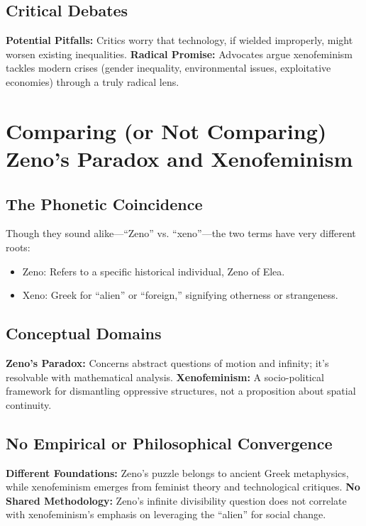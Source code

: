 \documentclass[12pt]{article}
\begin{document}
\subsection{Critical Debates}

\textbf{Potential Pitfalls:} Critics worry that technology, if wielded improperly, might worsen existing inequalities.  
\textbf{Radical Promise:} Advocates argue xenofeminism tackles modern crises (gender inequality, environmental issues, exploitative economies) through a truly radical lens.

\section{Comparing (or Not Comparing) Zeno’s Paradox and Xenofeminism}

\subsection{The Phonetic Coincidence}

Though they sound alike---``Zeno'' vs. ``xeno''---the two terms have very different roots: 
\begin{itemize}
    \item Zeno: Refers to a specific historical individual, Zeno of Elea. 
    \item Xeno: Greek for ``alien'' or ``foreign,'' signifying otherness or strangeness.
\end{itemize}

\subsection{Conceptual Domains}

\textbf{Zeno’s Paradox:} Concerns abstract questions of motion and infinity; it's resolvable with mathematical analysis.  
\textbf{Xenofeminism:} A socio-political framework for dismantling oppressive structures, not a proposition about spatial continuity.

\subsection{No Empirical or Philosophical Convergence}

\textbf{Different Foundations:} Zeno’s puzzle belongs to ancient Greek metaphysics, while xenofeminism emerges from feminist theory and technological critiques.  
\textbf{No Shared Methodology:} Zeno’s infinite divisibility question does not correlate with xenofeminism’s emphasis on leveraging the ``alien'' for social change.
\end{document}
